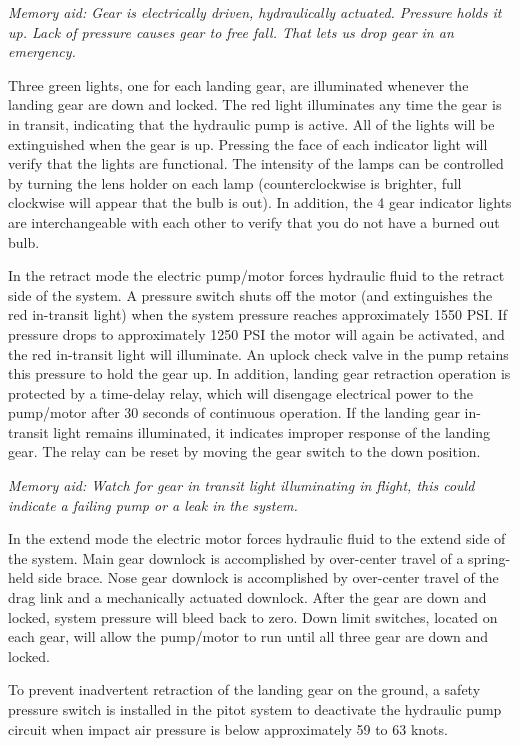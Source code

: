 {\emph{Memory aid: Gear is electrically driven, hydraulically actuated. Pressure holds it up. Lack of pressure causes gear to free fall. That lets us drop gear in an emergency.}

Three green lights, one for each landing gear, are illuminated whenever the landing gear are down and locked. The
red light illuminates any time the gear is in transit, indicating that the hydraulic pump is active. All of the lights will
be extinguished when the gear is up. Pressing the face of each indicator light will verify that the lights are
functional. The intensity of the lamps can be controlled by turning the lens holder on each lamp (counterclockwise
is brighter, full clockwise will appear that the bulb is out). In addition, the 4 gear indicator lights are
interchangeable with each other to verify that you do not have a burned out bulb.

In the retract mode the electric pump/motor forces hydraulic fluid to the retract side of the system. A pressure
switch shuts off the motor (and extinguishes the red in-transit light) when the system pressure reaches approximately
1550 PSI. If pressure drops to approximately 1250 PSI the motor will again be activated, and the red in-transit light
will illuminate. An uplock check valve in the pump retains this pressure to hold the gear up. In addition, landing
gear retraction operation is protected by a time-delay relay, which will disengage electrical power to the pump/motor
after 30 seconds of continuous operation. If the landing gear in-transit light remains illuminated, it indicates
improper response of the landing gear. The relay can be reset by moving the gear switch to the down position.

\emph{Memory aid: Watch for gear in transit light illuminating in flight, this could indicate a failing pump or a leak in the system.}

In the extend mode the electric motor forces hydraulic fluid to the extend side of the system. Main gear downlock is
accomplished by over-center travel of a spring-held side brace. Nose gear downlock is accomplished by over-center
travel of the drag link and a mechanically actuated downlock. After the gear are down and locked, system pressure
will bleed back to zero. Down limit switches, located on each gear, will allow the pump/motor to run until all three
gear are down and locked.

To prevent inadvertent retraction of the landing gear on the ground, a safety pressure switch is installed in the pitot
system to deactivate the hydraulic pump circuit when impact air pressure is below approximately 59 to 63 knots.

}

